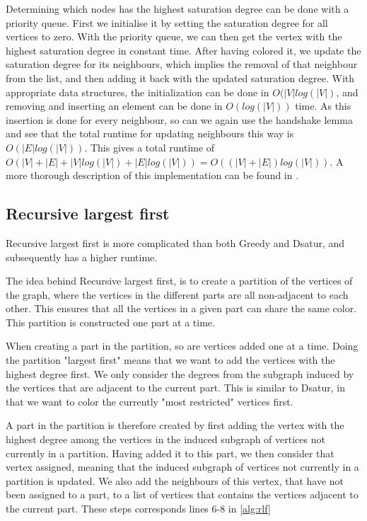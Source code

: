 \documentclass[a4paper]{article}
\begin{document}
Determining which nodes has the highest saturation degree can be done with a
priority queue.  First we initialise it by setting the saturation degree for all
vertices to zero. With the priority queue, we can then get the vertex with the
highest saturation degree in constant time. After having colored it, we update
the saturation degree for its neighbours, which implies the removal of that
neighbour from the list, and then adding it back with the updated saturation
degree. With appropriate data structures, the initialization can be done in
$O(|V|log(|V|)$, and removing and inserting an element can be done in $O(log(|V|))$
time. As this insertion is done for every neighbour, so can we again use the handshake
lemma and see that the total runtime for updating neighbours this way is
$O(|E|log(|V|))$. This gives a total runtime of $O(|V|+|E|+|V|log(|V|)+|E|log(|V|))
= O( (|V|+|E|)log(|V|))$. A more thorough description of this implementation can
be found in \cite{Constructive}.

\subsection{Recursive largest first}

Recursive largest first is more complicated than both Greedy and Dsatur, 
and subsequently has a higher runtime.

The idea behind Recursive largest first, is to create a partition of the
vertices of the graph, where the vertices in the different parts are all
non-adjacent to each other. This ensures that all the vertices in a given part
can share the same color.  This partition is constructed one part at a time. 

When creating a part in the partition, so are vertices added one at a time. Doing the
partition "largest first" means that we want to add the vertices with the
highest degree first. We only consider the degrees from the subgraph induced by
the vertices that are adjacent to the current part. This is similar to Dsatur,
in that we want to color the currently "most restricted" vertices first.

A part in the partition is therefore created by first adding the vertex with
the highest degree among the vertices in the induced subgraph of vertices not
currently in a partition. Having added it to this part, we then consider that
vertex assigned, meaning that the induced subgraph of vertices not currently in
a partition is updated.  We also add the neighbours of this vertex, that
have not been assigned to a part, to a list of vertices that contains the
vertices adjacent to the current part.  
These steps corresponds lines 6-8 in \autoref{alg:rlf}
\end{document}
